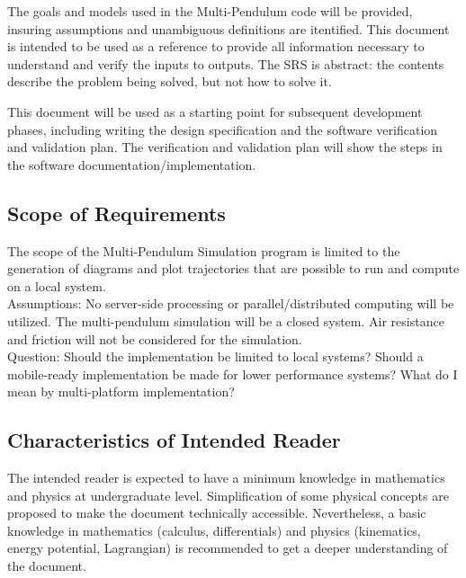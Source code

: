 \documentclass[12pt]{article}
\begin{document}
The goals and models used in the Multi-Pendulum code will be provided, insuring
assumptions and unambiguous definitions are itentified. This document 
is intended to be used as a reference to provide all information necessary to 
understand and verify the inputs to outputs. The SRS is abstract: the contents 
describe the problem being solved, but not how to solve it.

This document will be used as a starting point for subsequent development
phases, including writing the design specification and the software verification
and validation plan. The verification and validation plan will show the steps in 
the software documentation/implementation.


\subsection{Scope of Requirements} 

The scope of the Multi-Pendulum Simulation program is limited to the generation 
of diagrams and plot trajectories that are possible to run and compute on a local system.\\

Assumptions: No server-side processing or parallel/distributed computing will be utilized.
The multi-pendulum simulation will be a closed system. Air resistance and friction will 
not be considered for the simulation.\\

Question: Should the implementation be limited to local systems? Should a mobile-ready 
implementation be made for lower performance systems? What do I mean by multi-platform implementation?

\subsection{Characteristics of Intended Reader} 
The intended reader is expected to have a minimum knowledge in mathematics and physics at
undergraduate level. Simplification of some physical concepts are proposed to
make the document technically accessible. Nevertheless, a basic knowledge in
mathematics (calculus, differentials) and physics (kinematics, energy potential, Lagrangian) is 
recommended to get a deeper understanding of the document.
\end{document}
